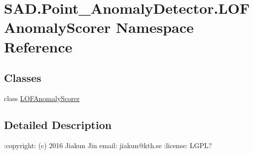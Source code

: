 \hypertarget{namespaceSAD_1_1Point__AnomalyDetector_1_1LOFAnomalyScorer}{}\section{S\+A\+D.\+Point\+\_\+\+Anomaly\+Detector.\+L\+O\+F\+Anomaly\+Scorer Namespace Reference}
\label{namespaceSAD_1_1Point__AnomalyDetector_1_1LOFAnomalyScorer}
\subsection*{Classes}
\begin{DoxyCompactItemize}
\item 
class \hyperlink{classSAD_1_1Point__AnomalyDetector_1_1LOFAnomalyScorer_1_1LOFAnomalyScorer}{L\+O\+F\+Anomaly\+Scorer}
\end{DoxyCompactItemize}


\subsection{Detailed Description}
\begin{DoxyVerb}:copyright: (c) 2016 Jiakun Jin
email: jiakun@kth.se
:license: LGPL?
\end{DoxyVerb}
 